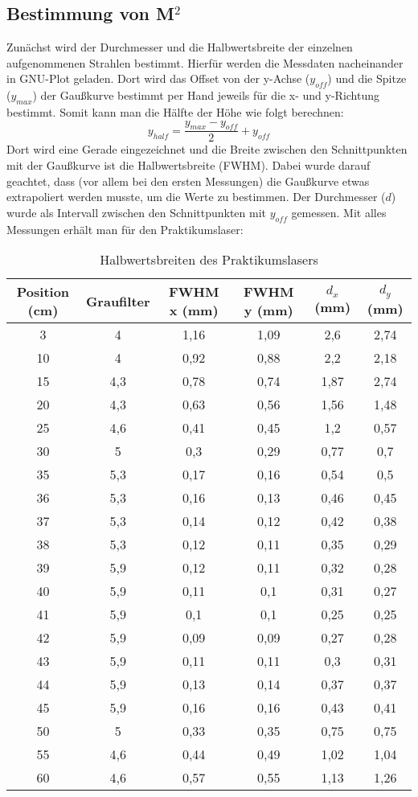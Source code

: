 \subsection{Bestimmung von M$^2$}
Zunächst wird der Durchmesser und die Halbwertsbreite der einzelnen aufgenommenen Strahlen bestimmt.
Hierfür werden die Messdaten nacheinander in GNU-Plot geladen.
Dort wird das Offset von der y-Achse ($y_{off}$) und die Spitze ($y_{max}$) der Gaußkurve bestimmt per Hand jeweils für die x- und y-Richtung bestimmt.
Somit kann man die Hälfte der Höhe wie folgt berechnen:
\begin{equation}
    y_{half}=\frac{y_{max}-y_{off}}{2}+y_{off}
\end{equation}
Dort wird eine Gerade eingezeichnet und die Breite zwischen den Schnittpunkten mit der Gaußkurve ist die Halbwertsbreite (FWHM).
Dabei wurde darauf geachtet, dass (vor allem bei den ersten Messungen) die Gaußkurve etwas extrapoliert werden musste, um die Werte zu bestimmen.
Der Durchmesser ($d$) wurde als Intervall zwischen den Schnittpunkten mit $y_{off}$ gemessen.
Mit alles Messungen erhält man für den Praktikumslaser:
\begin{table}[h]
    \centering
      \begin{tabular}{cc|cccc}
      Position (cm)& Graufilter & FWHM x (mm) & FWHM y (mm) & $d_x$ (mm) & $d_y$ (mm) \\\hline
      3 & 4 & 1,16 & 1,09 & 2,6 & 2,74 \\
      10 & 4 & 0,92 & 0,88 & 2,2 & 2,18 \\
      15 & 4,3 & 0,78 & 0,74 & 1,87 & 2,74 \\
      20 & 4,3 & 0,63 & 0,56 & 1,56 & 1,48 \\
      25 & 4,6 & 0,41 & 0,45 & 1,2 & 0,57 \\
      30 & 5 & 0,3 & 0,29 & 0,77 & 0,7 \\
      35 & 5,3 & 0,17 & 0,16 & 0,54 & 0,5 \\
      36 & 5,3 & 0,16 & 0,13 & 0,46 & 0,45 \\
      37 & 5,3 & 0,14 & 0,12 & 0,42 & 0,38 \\
      38 & 5,3 & 0,12 & 0,11 & 0,35 & 0,29 \\
      39 & 5,9 & 0,12 & 0,11 & 0,32 & 0,28 \\
      40 & 5,9 & 0,11 & 0,1 & 0,31 & 0,27 \\
      41 & 5,9 & 0,1 & 0,1 & 0,25 & 0,25 \\
      42 & 5,9 & 0,09 & 0,09 & 0,27 & 0,28 \\
      43 & 5,9 & 0,11 & 0,11 & 0,3 & 0,31 \\
      44 & 5,9 & 0,13 & 0,14 & 0,37 & 0,37 \\
      45 & 5,9 & 0,16 & 0,16 & 0,43 & 0,41 \\
      50 & 5 & 0,33 & 0,35 & 0,75 & 0,75 \\
      55 & 4,6 & 0,44 & 0,49 & 1,02 & 1,04 \\
      60 & 4,6 & 0,57 & 0,55 & 1,13 & 1,26 \\
      \end{tabular}
      \caption{Halbwertsbreiten des Praktikumslasers}
  \end{table}

